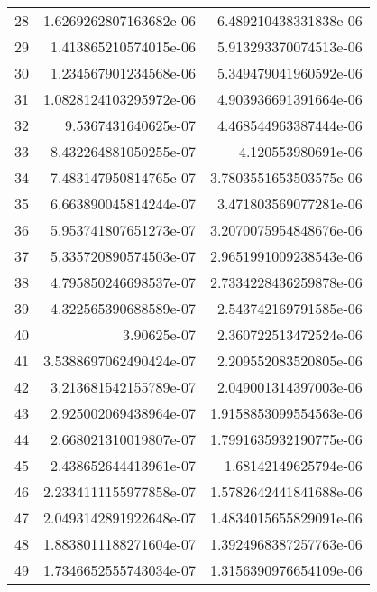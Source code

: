 \documentclass[]{article}
\begin{document}
\begin{tabular}{l  r r}
28 &      1.6269262807163682e-06 &   6.489210438331838e-06\\
29 &      1.413865210574015e-06   &  5.913293370074513e-06\\
30 &      1.234567901234568e-06   &  5.349479041960592e-06\\
31 &      1.0828124103295972e-06 &   4.903936691391664e-06\\
32 &      9.5367431640625e-07      & 4.468544963387444e-06\\
33 &      8.432264881050255e-07  &   4.120553980691e-06\\
34 &      7.483147950814765e-07  &   3.7803551653503575e-06\\
35 &      6.663890045814244e-07  &   3.471803569077281e-06\\
36 &      5.953741807651273e-07  &   3.2070075954848676e-06\\
37 &      5.335720890574503e-07  &   2.9651991009238543e-06\\
38 &      4.795850246698537e-07  &   2.7334228436259878e-06\\
39 &      4.322565390688589e-07  &   2.543742169791585e-06\\
40 &      3.90625e-07            &   2.360722513472524e-06\\
41 &      3.5388697062490424e-07  &  2.209552083520805e-06\\
42 &      3.213681542155789e-07   &  2.049001314397003e-06\\
43 &      2.925002069438964e-07  &   1.9158853099554563e-06\\
44 &      2.668021310019807e-07  &   1.7991635932190775e-06\\
45 &      2.438652644413961e-07   &  1.68142149625794e-06\\
46 &      2.2334111155977858e-07 &   1.5782642441841688e-06\\
47 &      2.0493142891922648e-07 &   1.4834015655829091e-06\\
48 &      1.8838011188271604e-07 &   1.3924968387257763e-06\\
49 &      1.7346652555743034e-07 &   1.3156390976654109e-06\\
\end{tabular} 


%  
% 
\end{document}

